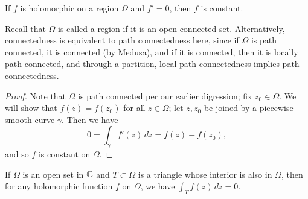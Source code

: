 \begin{corollary}
    If $f$ is holomorphic on a region $\Omega$ and $f' = 0$, then $f$ is constant.
\end{corollary}
\noindent Recall that $\Omega$ is called a region if it is an open connected set. Alternatively, connectedness is equivalent to path connectedness here, since if $\Omega$ is path connected, it is connected (by Medusa), and if it is connected, then it is locally path connected, and through a partition, local path connectedness implies path connectedness.
\begin{proof}
    Note that $\Omega$ is path connected per our earlier digression; fix $z_0 \in \Omega$. We will show that $f(z) = f(z_0)$ for all $z \in \Omega$; let $z, z_0$ be joined by a piecewise smooth curve $\gamma$. Then we have
    \[ 0 = \int_\gamma f'(z) \, dz = f(z) - f(z_0), \]
    and so $f$ is constant on $\Omega$.
\end{proof}
\newpage
\begin{theorem}
    If $\Omega$ is an open set in $\mathbb C$ and $T \subset \Omega$ is a triangle whose interior is also in $\Omega$, then for any holomorphic function $f$ on $\Omega$, we have $\int_T f(z) \, dz = 0$.
\end{theorem}
